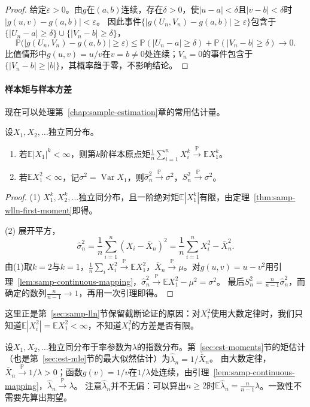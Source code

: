 \begin{proof}
给定$\varepsilon>0$。由$g$在$(a,b)$连续，存在$\delta>0$，使$|u-a|<\delta$且$|v-b|<\delta$时$|g(u,v)-g(a,b)|<\varepsilon$。
因此事件$\{|g(U_n,V_n)-g(a,b)|\geq\varepsilon\}$包含于$\{|U_n-a|\geq\delta\}\cup\{|V_n-b|\geq\delta\}$，
\[
  \mathbb{P}\bigl(|g(U_n,V_n)-g(a,b)|\geq\varepsilon\bigr)\leq\mathbb{P}(|U_n-a|\geq\delta)+\mathbb{P}(|V_n-b|\geq\delta)\to0.
\]
比值情形中$g(u,v)=u/v$在$v=b\neq0$处连续；$V_n=0$的事件包含于$\{|V_n-b|\geq|b|\}$，其概率趋于零，不影响结论。
\end{proof}

\paragraph{样本矩与样本方差}
现在可以处理第~\ref{chap:sample-estimation}章的常用估计量。

\begin{theorem}[样本矩与样本方差的一致性]
\label{thm:samp-moment-consistency}
设$X_1,X_2,\dots$独立同分布。
\begin{enumerate}
  \item 若$\mathbb{E}|X_1|^k<\infty$，则第$k$阶样本原点矩$\frac1n\sum_{i=1}^nX_i^k\xrightarrow{\mathbb{P}}\mathbb{E}X_1^k$。
  \item 若$\mathbb{E}X_1^2<\infty$，记$\sigma^2=\operatorname{Var}X_1$，则$\hat\sigma_n^2\xrightarrow{\mathbb{P}}\sigma^2$，$S_n^2\xrightarrow{\mathbb{P}}\sigma^2$。
\end{enumerate}
\end{theorem}

\begin{proof}
(1) $X_1^k,X_2^k,\dots$独立同分布，且一阶绝对矩$\mathbb{E}|X_1^k|$有限，由定理~\ref{thm:samp-wlln-first-moment}即得。

(2) 展开平方，
\[
  \hat\sigma_n^2=\frac1n\sum_{i=1}^n(X_i-\bar X_n)^2=\frac1n\sum_{i=1}^nX_i^2-\bar X_n^2.
\]
由(1)取$k=2$与$k=1$，$\frac1n\sum_iX_i^2\xrightarrow{\mathbb{P}}\mathbb{E}X_1^2$，$\bar X_n\xrightarrow{\mathbb{P}}\mu$。对$g(u,v)=u-v^2$用引理~\ref{lem:samp-continuous-mapping}，$\hat\sigma_n^2\xrightarrow{\mathbb{P}}\mathbb{E}X_1^2-\mu^2=\sigma^2$。
最后$S_n^2=\frac{n}{n-1}\hat\sigma_n^2$，而确定的数列$\frac n{n-1}\to1$，再用一次引理即得。
\end{proof}

这里正是第~\ref{sec:samp-lln}节保留截断论证的原因：对$X_i^2$使用大数定律时，我们只知道$\mathbb{E}|X_i^2|=\mathbb{E}X_1^2<\infty$，不知道$X_i^2$的方差是否有限。

\begin{example}[矩估计的一致性]
\label{ex:samp-exponential-rate-consistency}
设$X_1,X_2,\dots$独立同分布于率参数为$\lambda$的指数分布。第~\ref{sec:est-moments}节的矩估计（也是第~\ref{sec:est-mle}节的最大似然估计）为$\hat\lambda_n=1/\bar X_n$。
由大数定律，$\bar X_n\xrightarrow{\mathbb{P}}1/\lambda>0$；函数$g(v)=1/v$在$1/\lambda$处连续，由引理~\ref{lem:samp-continuous-mapping}，$\hat\lambda_n\xrightarrow{\mathbb{P}}\lambda$。
注意$\hat\lambda_n$并不无偏：可以算出$n\geq2$时$\mathbb{E}\hat\lambda_n=\frac{n}{n-1}\lambda$。一致性不需要先算出期望。
\end{example}

